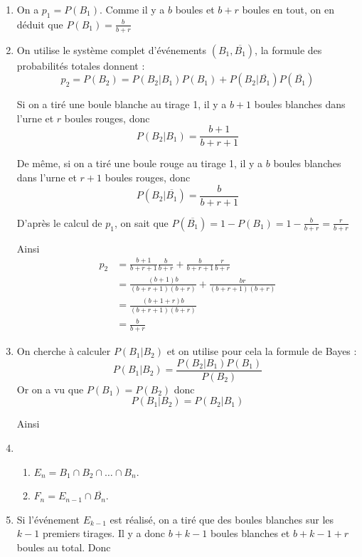 \begin{correction}
\begin{enumerate}


\item On a $p_1=P(B_1)$. Comme il y a $b$ boules et $b+r$ boules en tout, on en déduit que $P(B_1) =\frac{b}{b+r}$ 

\item On utilise le système complet d'événements $(B_1, \overline{B_1})$, la formule des probabilités totales donnent : 
$$p_2=P(B_2) =P(B_2|B_1) P(B_1) +P(B_2 |\overline{B_1})P(\overline{B_1})$$

Si on a tiré une boule blanche au tirage 1, il y a $b+1$ boules blanches dans l'urne et $r$ boules rouges, donc 
$$P(B_2|B_1)  =\frac{b+1}{b+r+1}$$

De même, si on a tiré une boule rouge au tirage 1, il y a $b$ boules blanches dans l'urne et $r+1$ boules rouges, donc 
$$P(B_2|\overline{B_1})  =\frac{b}{b+r+1}$$

D'après le calcul de $p_1$, on sait que $P(\overline{B_1})= 1-P(B_1) =1-\frac{b}{b+r}= \frac{r}{b+r}$

Ainsi 
\begin{align*}
p_2&=\frac{b+1}{b+r+1} \frac{b}{b+r} + \frac{b}{b+r+1} \frac{r}{b+r}\\
	&=\frac{(b+1)b}{(b+r+1)(b+r)} + \frac{br}{(b+r+1)(b+r)} \\
	&=\frac{(b+1+r)b}{(b+r+1)(b+r)}  \\
	&=\frac{b}{b+r}  
\end{align*}


\item On cherche à calculer $P(B_1|B_2)$ et on utilise pour cela la formule de Bayes :
$$P(B_1|B_2) =\frac{P(B_2|B_1) P(B_1)}{P(B_2)}$$
Or on a vu que $P(B_1) =P(B_2)$ donc 
$$P(B_1|B_2) =P(B_2|B_1)$$

Ainsi 
\item \begin{enumerate}
\item $E_n = B_1 \cap B_2 \cap \dots \cap B_{n} $. 
\item $F_n =E_{n-1} \cap \overline{B_n}$. 
\end{enumerate}
\item Si l'événement $E_{k-1} $ est réalisé, on a tiré que des boules blanches sur les $k-1$ premiers tirages. Il y a donc $b+k-1$ boules blanches et $b+k-1+r$ boules au total. 
Donc  


\end{enumerate}
\end{correction}
